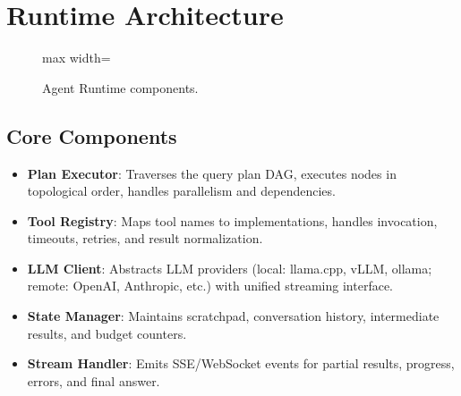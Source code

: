 \section{Runtime Architecture}
\label{sec:runtime:architecture}

\begin{figure}[htbp]
\centering
\begin{adjustbox}{max width=\textwidth}
\end{adjustbox}
\caption{Agent Runtime components.}
\label{fig:runtime:arch}
\end{figure}

\subsection{Core Components}
\label{sec:runtime:components}

\begin{itemize}
  \item \textbf{Plan Executor}: Traverses the query plan DAG, executes nodes in topological order, handles parallelism and dependencies.
  \item \textbf{Tool Registry}: Maps tool names to implementations, handles invocation, timeouts, retries, and result normalization.
  \item \textbf{LLM Client}: Abstracts LLM providers (local: llama.cpp, vLLM, ollama; remote: OpenAI, Anthropic, etc.) with unified streaming interface.
  \item \textbf{State Manager}: Maintains scratchpad, conversation history, intermediate results, and budget counters.
  \item \textbf{Stream Handler}: Emits SSE/WebSocket events for partial results, progress, errors, and final answer.
\end{itemize}

